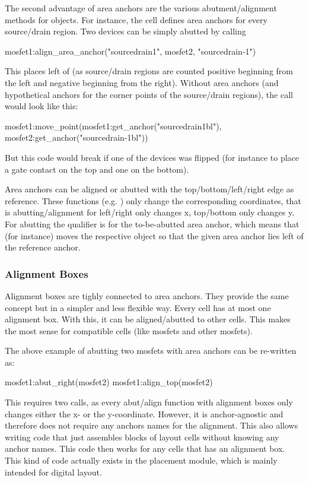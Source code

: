 The second advantage of area anchors are the various abutment/alignment methods for objects.
For instance, the cell  defines area anchors for every source/drain region.
Two devices can be simply abutted by calling
\begin{lualisting}
    mosfet1:align_area_anchor("sourcedrain1", mosfet2, "sourcedrain-1")
\end{lualisting}
This places  left of  (as source/drain regions are counted positive beginning from the left and negative beginning from the right).
Without area anchors (and hypothetical anchors for the corner points of the source/drain regions), the call would look like this:
\begin{lualisting}
    mosfet1:move_point(mosfet1:get_anchor("sourcedrain1bl"), mosfet2:get_anchor("sourcedrain-1bl"))
\end{lualisting}
But this code would break if one of the devices was flipped (for instance to place a gate contact on the top and one on the bottom).

Area anchors can be aligned or abutted with the top/bottom/left/right edge as reference.
These functions (e.g. ) only change the corresponding coordinates, that is abutting/alignment for left/right only changes x, top/bottom only changes y.
For abutting the qualifier is for the to-be-abutted area anchor, which means that (for instance)  moves the respective object so that the given area anchor lies left of the reference anchor.

\subsubsection{Alignment Boxes}
Alignment boxes are tighly connected to area anchors.
They provide the same concept but in a simpler and less flexible way.
Every cell has at most one alignment box.
With this, it can be aligned/abutted to other cells.
This makes the most sense for compatible cells (like mosfets and other mosfets).

The above example of abutting two mosfets with area anchors can be re-written as:
\begin{lualisting}
    mosfet1:abut_right(mosfet2)
    mosfet1:align_top(mosfet2)
\end{lualisting}
This requires two calls, as every abut/align function with alignment boxes only changes either the x- or the y-coordinate.
However, it is anchor-agnostic and therefore does not require any anchors names for the alignment.
This also allows writing code that just assembles blocks of layout cells without knowing any anchor names.
This code then works for any cells that has an alignment box.
This kind of code actually exists in the placement module, which is mainly intended for digital layout.

